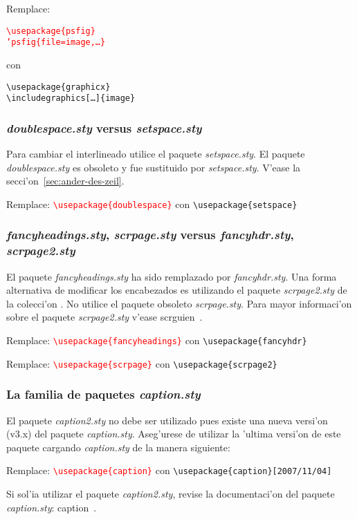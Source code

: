 \documentclass[11pt,a4paper,pagesize,tablecaptionabove,abstracton,pointlessnumbers]{scrartcl}
\newcommand{\TB}{\textbackslash}
\newcommand{\Doku}[1]{\textsf{#1}\xspace}
\newcommand{\Paket}[1]{\textsf{\textsl{#1.sty}}\xspace}
\newcommand{\Use}[1]{\texttt{\textbackslash usepackage\{#1\}}}
\newcommand{\UseV}[2]{\texttt{\TB usepackage\{#1\}[#2]}}
\DeclareRobustCommand*{\LMacro}[2]{\mbox{\texttt{\char`\\#1\{#2\}}}}
\newcommand{\Ersetze}[2]{\par\noindent Remplace: \textcolor{red}{#1}
  con \textcolor{gruen}{#2}}
\begin{document}
\sbox{\Breite}{\LMacro{psfig}{file=Bild,\dots}}
\Ersetze{\parbox[t]{0.35\textwidth}{\Use{psfig}\\%
    \LMacro{psfig}{file=image,\dots}}}%
{\parbox[t]{.45\textwidth}{%
    \Use{graphicx}\\%
    \texttt{\textbackslash includegraphics[\dots]\{image\}}}}

\subsubsection{\Paket{doublespace} versus \Paket{setspace}}
\label{sec:zeilenabstande}

Para cambiar el interlineado utilice el paquete \Paket{setspace}.
El paquete \Paket{doublespace} es obsoleto y fue sustituido por \Paket{setspace}.
V'ease la secci'on~\vref{sec:ander-des-zeil}.

\Ersetze{\Use{doublespace}}{\Use{setspace}}

\subsubsection{\Paket{fancyheadings}, \Paket{scrpage} versus \Paket{fancyhdr}, \Paket{scrpage2}}
\label{sec:lebende-kolumn}

El paquete \Paket{fancyheadings} ha sido remplazado por \Paket{fancyhdr}. Una forma alternativa de modificar los encabezados es utilizando el paquete \Paket{scrpage2} de la colecci'on \KOMAScript. No utilice el paquete obsoleto \Paket{scrpage}. Para mayor informaci'on sobre el paquete \Paket{scrpage2} v'ease \Doku{scrguien}~\cite{kohm:03}.

\Ersetze{\Use{fancyheadings}}{\Use{fancyhdr}}
\Ersetze{\Use{scrpage}}{\Use{scrpage2}}

\subsubsection{La familia de paquetes \Paket{caption}}
\label{sec:die-caption-famile}

El paquete \Paket{caption2} no debe ser utilizado pues existe una nueva versi'on (v3.x) del paquete \Paket{caption}. Aseg'urese de utilizar la 'ultima versi'on de este paquete cargando \Paket{caption} de la manera siguiente:
\Ersetze{\Use{caption}}{\UseV{caption}{2007/11/04}}

Si sol'ia utilizar el paquete \Paket{caption2}, revise la documentaci'on del paquete \Paket{caption}: \Doku{caption}~\cite[secci'on~8]{caption:04}.
\end{document}
